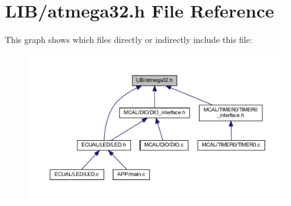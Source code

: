 \section{L\+I\+B/atmega32.h File Reference}
\label{atmega32_8h}
This graph shows which files directly or indirectly include this file\+:
\nopagebreak
\begin{figure}[H]
\begin{center}
\leavevmode
\includegraphics[width=350pt]{atmega32_8h__dep__incl}
\end{center}
\end{figure}

